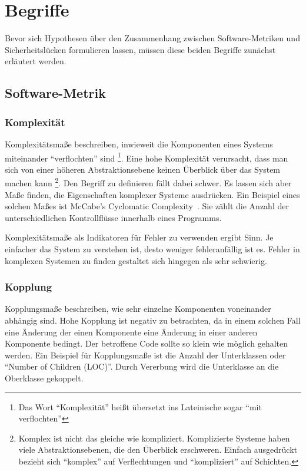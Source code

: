\section{Begriffe}
\label{sec:begriffe}
Bevor sich Hypothesen über den Zusammenhang zwischen Software-Metriken und Sicherheitslücken formulieren lassen, müssen diese beiden Begriffe zunächst erläutert werden.
\subsection{Software-Metrik}

\subsubsection{Komplexität}
Komplexitätsmaße beschreiben, inwieweit die Komponenten eines Systems miteinander "`verflochten"' sind
\footnote{Das Wort "`Komplexität"' heißt übersetzt ins Lateinische sogar "`mit verflochten"'}.
Eine hohe Komplexität verursacht, dass man sich von einer höheren Abstraktionsebene keinen Überblick über das System machen kann
\footnote{Komplex ist nicht das gleiche wie kompliziert. Komplizierte Systeme haben viele Abstraktionsebenen, die den Überblick erschweren. Einfach ausgedrückt bezieht sich "`komplex"' auf Verflechtungen und "`kompliziert"' auf Schichten.}.
Den Begriff zu definieren fällt dabei schwer.
Es lassen sich aber Maße finden, die Eigenschaften komplexer Systeme ausdrücken.
Ein Beispiel eines solchen Maßes ist McCabe's Cyclomatic Complexity~\cite{mccabe1976}.
Sie zählt die Anzahl der unterschiedlichen Kontrollflüsse innerhalb eines Programms.

Komplexitätsmaße als Indikatoren für Fehler zu verwenden ergibt Sinn.
Je einfacher das System zu verstehen ist, desto weniger fehleranfällig ist es.
Fehler in komplexen Systemen zu finden gestaltet sich hingegen als sehr schwierig.

\subsubsection{Kopplung}
Kopplungsmaße beschreiben, wie sehr einzelne Komponenten voneinander abhängig sind.
Hohe Kopplung ist negativ zu betrachten, da in einem solchen Fall eine Änderung der einen Komponente eine Änderung in einer anderen Komponente bedingt.
Der betroffene Code sollte so klein wie möglich gehalten werden.
Ein Beispiel für Kopplungsmaße ist die Anzahl der Unterklassen oder "`Number of Children (LOC)"'.
Durch Vererbung wird die Unterklasse an die Oberklasse gekoppelt.

